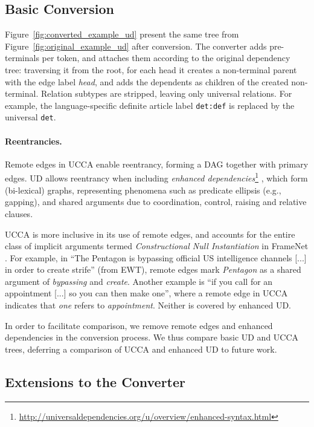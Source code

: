 \documentclass[11pt,a4paper]{article}
\begin{document}
\subsection{Basic Conversion}\label{sec:conversion}

Figure~\ref{fig:converted_example_ud} present the same tree from Figure~\ref{fig:original_example_ud}
after conversion.
The converter adds pre-terminals per token,
and attaches them according to the original dependency tree:
traversing it from the root, for each head it creates a non-terminal
parent with the edge label {\it head}, and adds the dependents as children of 
the created non-terminal.
Relation subtypes are stripped,
leaving only universal relations.
For example, the language-specific definite article label
\texttt{det:def} is replaced by the universal \texttt{det}.

\paragraph{Reentrancies.}
Remote edges in UCCA enable reentrancy, forming a DAG together with primary edges.
UD allows reentrancy when including \textit{enhanced dependencies}\footnote{\url{http://universaldependencies.org/u/overview/enhanced-syntax.html}}
\cite{SCHUSTER16.779}, which form (bi-lexical) graphs, representing phenomena
such as predicate ellipsis (e.g., gapping),
and shared arguments due to coordination, control, raising and relative clauses.

UCCA is more inclusive in its use of remote edges, and accounts for 
the entire class of implicit arguments termed {\it Constructional Null Instantiation} in FrameNet \citep{Ruppenhofer:16}.
For example, in
``The Pentagon is bypassing official US intelligence channels [...] in order to create strife'' (from EWT),
remote edges mark \textit{Pentagon} as a shared argument of \textit{bypassing} and
\textit{create}. 
Another example is ``if you call for an appointment [...] so you can then make one'',
where a remote edge in UCCA indicates that \textit{one} refers to \textit{appointment}.
Neither is covered by enhanced UD.

In order to facilitate comparison, we remove remote edges and enhanced dependencies in the conversion process.
We thus compare basic UD and UCCA trees, deferring a comparison of UCCA and enhanced UD to future work.



\subsection{Extensions to the Converter}\label{sec:local}
\end{document}
